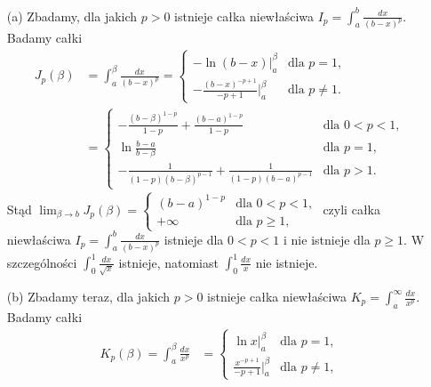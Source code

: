 \documentclass[leqno]{article}
\begin{document}
\begin{justify}
\begin{ex}
    \begin{itemize}
        \item [(a)]
            Zbadamy, dla jakich $p > 0$ istnieje całka niewłaściwa $I_p = \int_{a}^{b}\frac{dx}{(b-x)^p}$.
            Badamy całki
            \begin{align*}
                J_p(\beta) &= \int_{a}^{\beta}\frac{dx}{(b-x)^p} = 
                    \begin{cases}
                        -\ln(b-x) \big|_a^\beta & \text{dla } p = 1, \\
                        -\frac{(b-x)^{-p+1}}{-p+1}\big|_a^\beta & \text{dla } p \neq 1.
                    \end{cases} \\
                    &= 
                    \begin{cases}
                        -\frac{(b-\beta)^{1-p}}{1-p} + \frac{(b-a)^{1-p}}{1-p} & \text{dla } 0 < p < 1, \\
                        \ln{\frac{b-a}{b-\beta}}& \text{dla } p = 1, \\
                        -\frac{1}{(1-p)(b-\beta)^{p-1}} + \frac{1}{(1-p)(b-a)^{p-1}} & \text{dla } p >  1.
                    \end{cases}
            \end{align*}
            Stąd $\lim_{\beta \to b}J_p(\beta) = 
            \begin{cases}
                (b-a)^{1-p} & \text{dla } 0 < p < 1, \\
                +\infty & \text{dla } p \geqslant 1,
            \end{cases}$
            czyli całka niewłaściwa $I_p = \int_{a}^{b}\frac{dx}{(b-x)^p}$ istnieje dla $0 < p < 1$ i nie istnieje dla $p \geqslant 1$. 
            W szczególności $\int_{0}^{1}\frac{dx}{\sqrt{x}}$ istnieje, natomiast $\int_{0}^{1}\frac{dx}{x}$ nie istnieje.
        \item [(b)]
            Zbadamy teraz, dla jakich $p > 0$ istnieje całka niewłaściwa $K_p = \int_{a}^{\infty} \frac{dx}{x^p}$. Badamy całki
            \begin{align*}
                K_p(\beta) = \int_{a}^{\beta}\frac{dx}{x^p} &= 
                \begin{cases}
                    \ln x \big|_a^\beta & \text{dla } p = 1, \\
                    \frac{x^{-p+1}}{-p+1}\big|_a^\beta & \text{dla } p \neq 1,
                \end{cases} \\

\end{align*}
\end{itemize}
\end{ex}
\end{justify}
\end{document}
